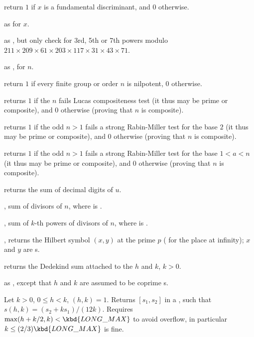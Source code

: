  return $1$ if $x$ is a fundamental
discriminant, and $0$ otherwise.

 as 
for  $x$.

 as , but
only check for 3rd, 5th or 7th powers modulo
$211\times209\times61\times203\times117\times31\times43\times71$.

 as , for
 $n$.

 return $1$ if every finite group or order $n$
is nilpotent, $0$ otherwise.

 returns $1$ if the  $n$ fails Lucas
compositeness test (it thus may be prime or composite), and $0$ otherwise
(proving that $n$ is composite).

 returns $1$ if the odd  $n > 1$ fails a
strong Rabin-Miller test for the base $2$ (it thus may be prime or
composite), and $0$ otherwise (proving that $n$ is composite).

 returns $1$ if the odd  $n > 1$
fails a strong Rabin-Miller test for the base $1 < a < n$ (it thus may be
prime or composite), and $0$ otherwise (proving that $n$ is composite).

 returns the sum of decimal digits of $u$.

, sum of divisors of  $n$, where
 is .

, sum of $k$-th powers of divisors
of  $n$, where  is .

, returns the Hilbert symbol
$(x,y)$ at the prime $p$ ( for the place at infinity); $x$ and $y$
are s.

 returns the Dedekind sum attached to
the  $h$ and $k$, $k > 0$.

 as , except
that $h$ and $k$ are assumed to be coprime s.

Let $k > 0$, $0 \leq h < k$, $(h,k) = 1$. Returns $[s_1,s_2]$
in a , such that $s(h,k) = (s_2 + k s_1) / (12k)$.
Requires $\max(h + k/2, k) < \kbd{LONG\_MAX}$
to avoid overflow, in particular $k \leq (2/3)\kbd{LONG\_MAX}$ is fine.

